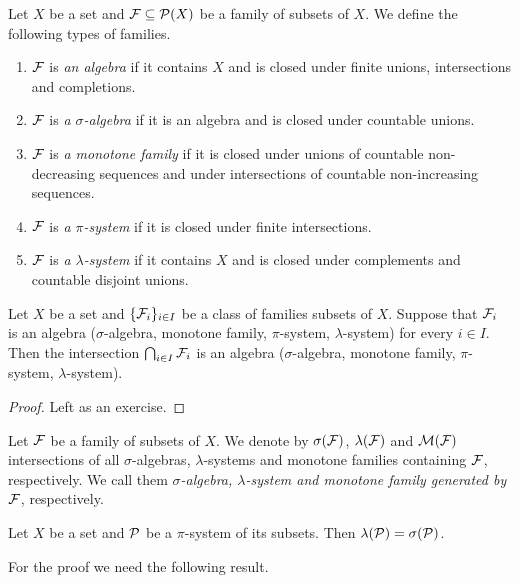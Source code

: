 \begin{definition}
Let $X$ be a set and ${\mathcal F}\subseteq {\mathcal P}(X)$ be a family of subsets of $X$. We define the following types of families.
\begin{enumerate}[label=\textbf{(\arabic*)}, leftmargin=*]
\item ${\mathcal F}$ is \textit{an algebra} if it contains $X$ and is closed under finite unions, intersections and completions. 
\item ${\mathcal F}$ is \textit{a $\sigma$-algebra} if it is an algebra and is closed under countable unions.
\item ${\mathcal F}$ is \textit{a monotone family} if it is closed under unions of countable non-decreasing sequences and under intersections of countable non-increasing sequences.
\item ${\mathcal F}$ is \textit{a $\pi$-system} if it is closed under finite intersections.
\item ${\mathcal F}$ is \textit{a $\lambda$-system} if it contains $X$ and is closed under complements and countable disjoint unions. 
\end{enumerate}
\end{definition}

\begin{fact}\label{intersections}
Let $X$ be a set and $\{{\mathcal F}_i\}_{i\in I}$ be a class of families subsets of $X$. Suppose that ${\mathcal F}_i$ is an algebra ($\sigma$-algebra, monotone family, $\pi$-system, $\lambda$-system) for every $i\in I$. Then the intersection $\bigcap_{i\in I}{\mathcal F}_i$
is an algebra ($\sigma$-algebra, monotone family, $\pi$-system, $\lambda$-system).
\end{fact}
\begin{proof}
Left as an exercise.
\end{proof}

\begin{definition}
Let ${\mathcal F}$ be a family of subsets of $X$. We denote by $\sigma({\mathcal F})$, $\lambda({\mathcal F})$ and ${\mathcal M}({\mathcal F})$ intersections of all $\sigma$-algebras, $\lambda$-systems and monotone families containing ${\mathcal F}$, respectively. We call them \textit{$\sigma$-algebra, $\lambda$-system and monotone family generated by ${\mathcal F}$}, respectively. 
\end{definition}

\begin{theorem}\label{theorem:dynkinlemma}
Let $X$ be a set and ${\mathcal P}$ be a $\pi$-system of its subsets. Then $\lambda({\mathcal P})=\sigma({\mathcal P})$.
\end{theorem}
\noindent
For the proof we need the following result.

